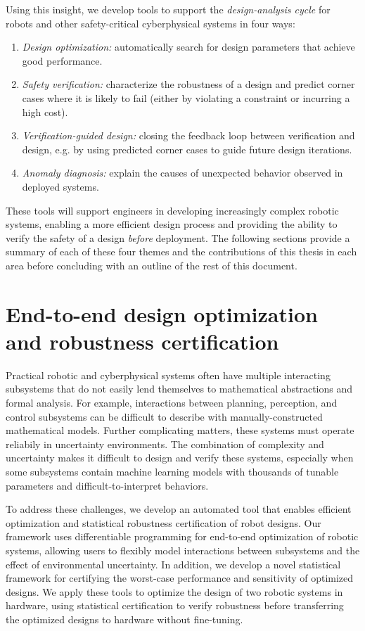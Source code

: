 Using this insight, we develop tools to support the \textit{design-analysis cycle} for robots and other safety-critical cyberphysical systems in four ways:
\begin{enumerate}
    \item \textit{Design optimization:} automatically search for design parameters that achieve good performance.
    \item \textit{Safety verification:} characterize the robustness of a design and predict corner cases where it is likely to fail (either by violating a constraint or incurring a high cost).
    \item \textit{Verification-guided design:} closing the feedback loop between verification and design, e.g. by using predicted corner cases to guide future design iterations.
    \item \textit{Anomaly diagnosis:} explain the causes of unexpected behavior observed in deployed systems.
\end{enumerate}
%
These tools will support engineers in developing increasingly complex robotic systems, enabling a more efficient design process and providing the ability to verify the safety of a design \textit{before} deployment. The following sections provide a summary of each of these four themes and the contributions of this thesis in each area before concluding with an outline of the rest of this document.

\section{End-to-end design optimization and robustness certification}

Practical robotic and cyberphysical systems often have multiple interacting subsystems that do not easily lend themselves to mathematical abstractions and formal analysis. For example, interactions between planning, perception, and control subsystems can be difficult to describe with manually-constructed mathematical models. Further complicating matters, these systems must operate reliabily in uncertainty environments. The combination of complexity and uncertainty makes it difficult to design and verify these systems, especially when some subsystems contain machine learning models with thousands of tunable parameters and difficult-to-interpret behaviors.

To address these challenges, we develop an automated tool that enables efficient optimization and statistical robustness certification of robot designs. Our framework uses differentiable programming for end-to-end optimization of robotic systems, allowing users to flexibly model interactions between subsystems and the effect of environmental uncertainty. In addition, we develop a novel statistical framework for certifying the worst-case performance and sensitivity of optimized designs. We apply these tools to optimize the design of two robotic systems in hardware, using statistical certification to verify robustness before transferring the optimized designs to hardware without fine-tuning.

